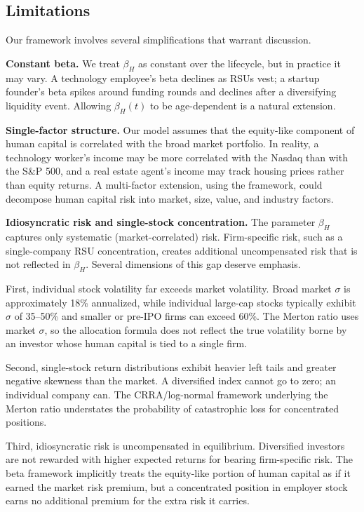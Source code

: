 \documentclass[11pt]{article}
\begin{document}
\subsection{Limitations}

Our framework involves several simplifications that warrant discussion.

\textbf{Constant beta.} We treat $\beta_H$ as constant over the
lifecycle, but in practice it may vary. A technology employee's beta
declines as RSUs vest; a startup founder's beta spikes around funding
rounds and declines after a diversifying liquidity event. Allowing
$\beta_H(t)$ to be age-dependent is a natural extension.

\textbf{Single-factor structure.} Our model assumes that the equity-like
component of human capital is correlated with the broad market portfolio.
In reality, a technology worker's income may be more correlated with the
Nasdaq than with the S\&P 500, and a real estate agent's income may track
housing prices rather than equity returns. A multi-factor extension, using
the \citet{fama1993} framework, could decompose human capital risk into
market, size, value, and industry factors.

\textbf{Idiosyncratic risk and single-stock concentration.} The parameter
$\beta_H$ captures only systematic (market-correlated) risk. Firm-specific
risk, such as a single-company RSU concentration, creates additional
uncompensated risk that is not reflected in $\beta_H$. Several dimensions
of this gap deserve emphasis.

First, individual stock volatility far exceeds market volatility. Broad
market $\sigma$ is approximately 18\% annualized, while individual large-cap
stocks typically exhibit $\sigma$ of 35--50\% and smaller or pre-IPO firms
can exceed 60\%. The Merton ratio uses market $\sigma$, so the allocation
formula does not reflect the true volatility borne by an investor whose
human capital is tied to a single firm.

Second, single-stock return distributions exhibit heavier left tails and
greater negative skewness than the market. A diversified index cannot go to
zero; an individual company can. The CRRA/log-normal framework underlying
the Merton ratio understates the probability of catastrophic loss for
concentrated positions.

Third, idiosyncratic risk is uncompensated in equilibrium. Diversified
investors are not rewarded with higher expected returns for bearing
firm-specific risk. The beta framework implicitly treats the equity-like
portion of human capital as if it earned the market risk premium, but a
concentrated position in employer stock earns no additional premium for the
extra risk it carries.
\end{document}
